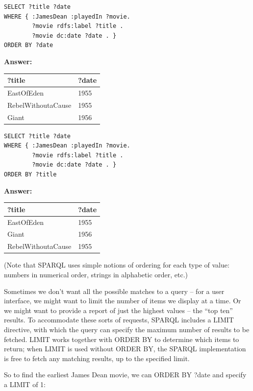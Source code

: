 
\begin{lstlisting}
SELECT ?title ?date
WHERE { :JamesDean :playedIn ?movie.
        ?movie rdfs:label ?title .
        ?movie dc:date ?date . }
ORDER BY ?date
\end{lstlisting}

\textbf{\textbf{Answer:}}

\begin{tabular}{|ll|}
\hline
?title&?date\\
\hline
EastOfEden&1955\\
RebelWithoutaCause&1955\\
Giant&1956\\
\hline
\end{tabular}


\begin{lstlisting}
SELECT ?title ?date
WHERE { :JamesDean :playedIn ?movie.
        ?movie rdfs:label ?title .
        ?movie dc:date ?date . }
ORDER BY ?title
\end{lstlisting}

\textbf{\textbf{Answer:}}

\begin{tabular}{|ll|}
\hline
?title&?date\\
\hline
EastOfEden&1955\\
Giant&1956\\
RebelWithoutaCause&1955\\
\hline
\end{tabular}

(Note that SPARQL uses simple notions of ordering for each type of
value: numbers in numerical order, strings in alphabetic order, etc.)

Sometimes we don't want all the possible matches to a query -- for a
user interface, we might want to limit the number of items we display at
a time. Or we might want to provide a report of just the highest values
-- the ``top ten'' results. To accommodate these sorts of requests,
SPARQL includes a LIMIT directive, with which the query can specify the
maximum number of results to be fetched. LIMIT works together with ORDER
BY to determine which items to return; when LIMIT is used without ORDER
BY, the SPARQL implementation is free to fetch any matching results, up
to the specified limit.

So to find the earliest James Dean movie, we can ORDER BY ?date and
specify a LIMIT of 1:

